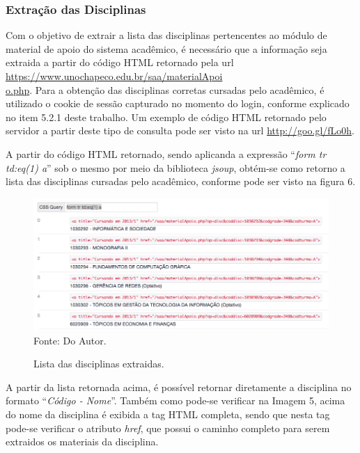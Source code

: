 \subsubsection{Extração das Disciplinas}
Com o objetivo de extrair a lista das disciplinas pertencentes ao módulo de material de apoio do sistema acadêmico, é necessário que a informação seja extraida a partir do código HTML retornado pela url \url{https://www.unochapeco.edu.br/saa/materialApoi} \\ \url{o.php}. Para a obtenção das disciplinas corretas cursadas pelo acadêmico, é utilizado o cookie de sessão capturado no momento do login, conforme explicado no item 5.2.1 deste trabalho. Um exemplo de código HTML retornado pelo servidor a partir deste tipo de consulta pode ser visto na url \url{http://goo.gl/fLo0h}.

A partir do código HTML retornado, sendo aplicanda a expressão ``\emph{form tr td:eq(1) a}'' sob o mesmo por meio da biblioteca \emph{jsoup}, obtém-se como retorno a lista das disciplinas cursadas pelo acadêmico, conforme pode ser visto na figura 6.

\begin{figure}[!htb]
     \centering
     \caption[Extração de Informações - Lista de Disciplinas do Material de Apoio]{Lista das disciplinas extraidas.}
     \includegraphics[scale=0.5]{imagens/listadisciplinasmaterialapoio.png}
     \\ Fonte: Do Autor.
\end{figure}

A partir da lista retornada acima, é possível retornar diretamente a disciplina no formato ``\emph{Código - Nome}''. Também como pode-se verificar na Imagem 5, acima do nome da disciplina é exibida a tag HTML completa, sendo que nesta tag pode-se verificar o atributo \emph{href}, que possui o caminho completo para serem extraidos os materiais da disciplina.

